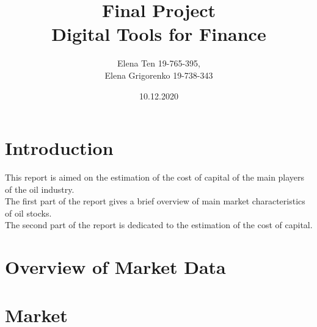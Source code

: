 \documentclass [a4paper, 11pt] {article}
\begin{document}
\title {\Huge Final Project \\
 \Huge Digital Tools for Finance }
\author {\huge Elena Ten 19-765-395, \\
	 	 \huge Elena Grigorenko 19-738-343}

\date {\huge 10.12.2020}



\maketitle
\thispagestyle{empty}

\newpage

\tableofcontents

\newpage

\section {Introduction}
This report is aimed on the estimation of the cost of capital of the main players of the oil industry.\\
The first part of the report gives a brief overview of main market characteristics of oil stocks.\\
The second part of the report is dedicated to the estimation of the cost of capital.

\section {Overview of Market Data}

\section{Market}

\end{document}
